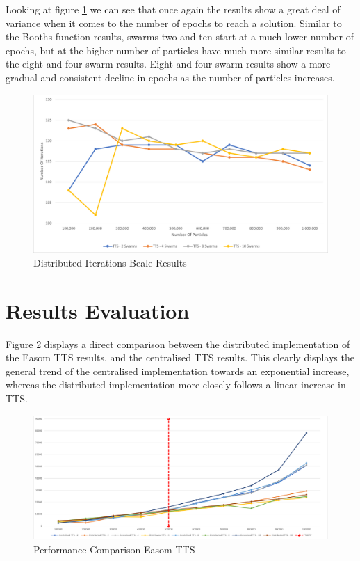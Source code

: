 \documentclass[oneside,12pt]{book}
\begin{document}
Looking at figure \ref{fig:Distributed_Epoc_Beale_Results} we can see that once again the results show a great deal of variance when it comes to the number of epochs to reach a solution. Similar to the Booths function results, swarms two and ten start at a much lower number of epochs, but at the higher number of particles have much more similar results to the eight and four swarm results. Eight and four swarm results show a more gradual and consistent decline in epochs as the number of particles increases. 

\begin{figure}[H]
    \centering
    \includegraphics[scale=0.45]{Images/Graphs/DistributedBealeEpoch.png}
    \caption{Distributed Iterations Beale Results}
    \label{fig:Distributed_Epoc_Beale_Results}
\end{figure}

\section{Results Evaluation}
Figure \ref{fig:PerformanceComparisonEasomTTS} displays a direct comparison between the distributed implementation of the Easom TTS results, and the centralised TTS results. This clearly displays the general trend of the centralised implementation towards an exponential increase, whereas the distributed implementation more closely follows a linear increase in TTS.  
\begin{figure}[H]
    \centering
    \includegraphics[scale=0.45]{Images/Graphs/PerformanceComparisonEasomTTS.png}
    \caption{Performance Comparison Easom TTS}
    \label{fig:PerformanceComparisonEasomTTS}
\end{figure}
\end{document}
